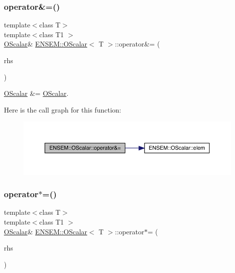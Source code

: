 \subsubsection{\texorpdfstring{operator\&=()}{operator\&=()}\hspace{0.1cm}{\footnotesize\ttfamily [2/2]}}
{\footnotesize\ttfamily template$<$class T$>$ \\
template$<$class T1 $>$ \\
\mbox{\hyperlink{classENSEM_1_1OScalar}{O\+Scalar}}\& \mbox{\hyperlink{classENSEM_1_1OScalar}{E\+N\+S\+E\+M\+::\+O\+Scalar}}$<$ T $>$\+::operator\&= (\begin{DoxyParamCaption}\item[{const \mbox{\hyperlink{classENSEM_1_1OScalar}{O\+Scalar}}$<$ T1 $>$ \&}]{rhs }\end{DoxyParamCaption})\hspace{0.3cm}{\ttfamily [inline]}}



\mbox{\hyperlink{classENSEM_1_1OScalar}{O\+Scalar}} \&= \mbox{\hyperlink{classENSEM_1_1OScalar}{O\+Scalar}}. 

Here is the call graph for this function\+:
\nopagebreak
\begin{figure}[H]
\begin{center}
\leavevmode
\includegraphics[width=350pt]{da/d80/classENSEM_1_1OScalar_a9a192875355f059d207c579e2514b2a3_cgraph}
\end{center}
\end{figure}
\mbox{\label{classENSEM_1_1OScalar_a9977cd15ef5da689d65713ddf0768085}} 
\subsubsection{\texorpdfstring{operator$\ast$=()}{operator*=()}\hspace{0.1cm}{\footnotesize\ttfamily [1/2]}}
{\footnotesize\ttfamily template$<$class T$>$ \\
template$<$class T1 $>$ \\
\mbox{\hyperlink{classENSEM_1_1OScalar}{O\+Scalar}}\& \mbox{\hyperlink{classENSEM_1_1OScalar}{E\+N\+S\+E\+M\+::\+O\+Scalar}}$<$ T $>$\+::operator$\ast$= (\begin{DoxyParamCaption}\item[{const \mbox{\hyperlink{classENSEM_1_1OScalar}{O\+Scalar}}$<$ T1 $>$ \&}]{rhs }\end{DoxyParamCaption})\hspace{0.3cm}{\ttfamily [inline]}}



